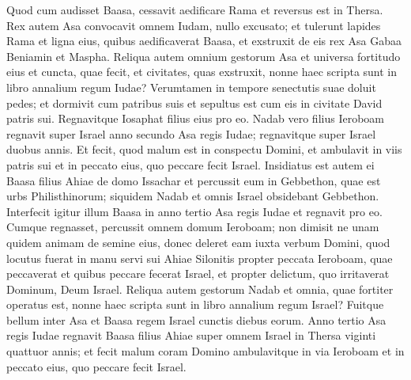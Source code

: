 \begin{biblechapter}
\verse Quod cum audisset Baasa, cessavit aedificare Rama et reversus est in Thersa.  
\verse Rex autem Asa convocavit omnem Iudam, nullo excusato; et tulerunt lapides Rama et ligna eius, quibus aedificaverat Baasa, et exstruxit de eis rex Asa Gabaa Beniamin et Maspha. 
\verse Reliqua autem omnium gestorum Asa et universa fortitudo eius et cuncta, quae fecit, et civitates, quas exstruxit, nonne haec scripta sunt in libro annalium regum Iudae? Verumtamen in tempore senectutis suae doluit pedes; 
\verse et dormivit cum patribus suis et sepultus est cum eis in civitate David patris sui. Regnavitque Iosaphat filius eius pro eo. 
\verse Nadab vero filius Ieroboam regnavit super Israel anno secundo Asa regis Iudae; regnavitque super Israel duobus annis. 
\verse Et fecit, quod malum est in conspectu Domini, et ambulavit in viis patris sui et in peccato eius, quo peccare fecit Israel. 
\verse Insidiatus est autem ei Baasa filius Ahiae de domo Issachar et percussit eum in Gebbethon, quae est urbs Philisthinorum; siquidem Nadab et omnis Israel obsidebant Gebbethon. 
\verse Interfecit igitur illum Baasa in anno tertio Asa regis Iudae et regnavit pro eo. 
\verse Cumque regnasset, percussit omnem domum Ieroboam; non dimisit ne unam quidem animam de semine eius, donec deleret eam iuxta verbum Domini, quod locutus fuerat in manu servi sui Ahiae Silonitis 
\verse propter peccata Ieroboam, quae peccaverat et quibus peccare fecerat Israel, et propter delictum, quo irritaverat Dominum, Deum Israel. 
\verse Reliqua autem gestorum Nadab et omnia, quae fortiter operatus est, nonne haec scripta sunt in libro annalium regum Israel? 
\verse Fuitque bellum inter Asa et Baasa regem Israel cunctis diebus eorum. 
\verse Anno tertio Asa regis Iudae regnavit Baasa filius Ahiae super omnem Israel in Thersa viginti quattuor annis; 
\verse et fecit malum coram Domino ambulavitque in via Ieroboam et in peccato eius, quo peccare fecit Israel. 
\end{biblechapter}

